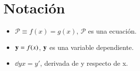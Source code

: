 
\chapter{Notación}
\begin{multicols}{2}
    \begin{itemize}
        \item $ \mathcal{P} \equiv f(x) = g(x)$, $\mathcal{P}$ es una ecuación.
        \item $\mathbf{y} = f(x)$, $\mathbf{y}$ es una variable dependiente.
        \item $\dd{y}{x} = y'$, derivada de y respecto de x.
    \end{itemize}
\end{multicols}
